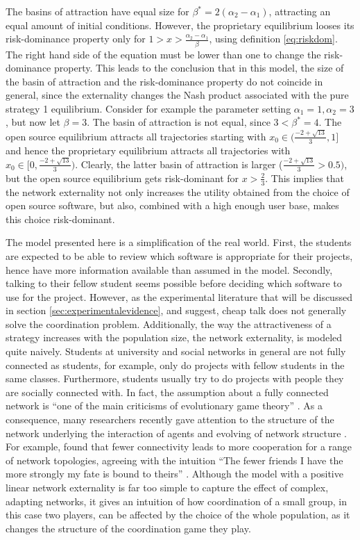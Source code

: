 The basins of attraction have equal size for $\beta^* = 2 (\alpha_2 -\alpha_1)$,
attracting an equal amount of initial conditions. However,
the proprietary equilibrium looses its risk-dominance property 
only for $1 > x > \frac{\alpha_2-\alpha_1}{\beta}  $, using definition 
\ref{eq:riskdom}. The right hand side of the equation must be lower than one 
to change the risk-dominance property. This leads to the conclusion 
that in this model, the size of the basin of attraction and the risk-dominance
property do not coincide in general, since the externality changes the Nash 
product associated with the pure strategy 1 equilibrium. Consider for example 
the parameter setting $\alpha_1 =1, \alpha_2=3$, but now let $\beta=3$. 
The basin of attraction is not equal, since $3<\beta^*= 4$. 
The open source equilibrium attracts all trajectories starting with 
$x_0 \in (\frac{-2+\sqrt{13}}{3},1]$ and hence the proprietary equilibrium attracts
all trajectories with $x_0 \in [0,\frac{-2+\sqrt{13}}{3})$. 
Clearly, the latter basin of 
attraction is larger ($\frac{-2+\sqrt{13}}{3}>0.5)$, 
but the open source equilibrium gets risk-dominant for
$x>\frac 23$. This implies that the network externality not only increases the
utility obtained from the choice of open source software, but also,
combined with a high enough user base, makes this choice risk-dominant. 

The model presented here is a simplification of the real world. 
First, the students are expected to be able to review which software is 
appropriate for their projects, hence have more information available than 
assumed in the model. Secondly, talking to their fellow student seems
possible before deciding which software to use for the project. 
However, as the experimental literature that will be discussed in section 
\ref{sec:experimentalevidence}, and \textcite{aumann_nash_1990} suggest, 
cheap talk does not generally solve the coordination problem. 
Additionally, the way the attractiveness of a strategy increases with
the population size, the network externality, is modeled quite naively.
Students at university and social networks in general are not fully
connected as students, for example, only do projects with fellow students
in the same classes. Furthermore, students usually try to do projects
with people they are socially connected with. In fact, the assumption about
a fully connected network is ``one of the main criticisms of evolutionary game
theory'' \parencite{hanauske_evolutionare_2011}. 
As a consequence, many researchers recently gave attention to the 
structure of the network underlying the interaction of agents and 
evolving of network structure \parencite[46]{szabo_evolutionary_2007}.
For example, \textcite{ohtsuki_simple_2006} found 
that fewer connectivity 
leads to more cooperation for a range of network topologies,
agreeing with the intuition
``The fewer friends I have the more strongly my fate is bound to theirs'' 
\parencite[1]{ohtsuki_simple_2006}.
Although the model with a positive linear network externality is far too 
simple to capture the effect of complex, adapting networks, it gives an 
intuition of how coordination of a small group, in this case two players, 
can be affected by the choice of the whole population, as it changes
the structure of the coordination game they play.
